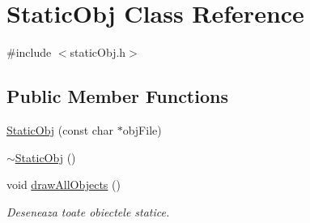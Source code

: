 \hypertarget{class_static_obj}{\section{Static\-Obj Class Reference}
\label{class_static_obj}
}


{\ttfamily \#include $<$static\-Obj.\-h$>$}

\subsection*{Public Member Functions}
\begin{DoxyCompactItemize}
\item 
\hyperlink{class_static_obj_adedc6727f2488cc926eb10ceaf7bce24}{Static\-Obj} (const char $\ast$obj\-File)
\item 
\hyperlink{class_static_obj_a0e9ad78e77930dd179a61892c101c7c7}{$\sim$\-Static\-Obj} ()
\item 
void \hyperlink{class_static_obj_a2bdd72e3c2edf70d8548f3a7ac86f91b}{draw\-All\-Objects} ()
\begin{DoxyCompactList}\small\item\em Deseneaza toate obiectele statice. \end{DoxyCompactList}\end{DoxyCompactItemize}
